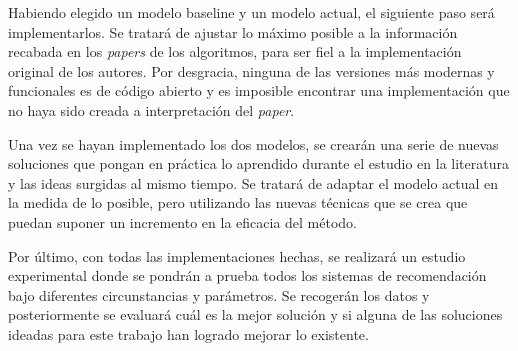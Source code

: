 Habiendo elegido un modelo baseline y un modelo actual, el siguiente paso será implementarlos. Se tratará de ajustar lo máximo posible a la información recabada en los \textit{papers} de los algoritmos, para ser fiel a la implementación original de los autores. Por desgracia, ninguna de las versiones más modernas y funcionales es de código abierto y es imposible encontrar una implementación que no haya sido creada a interpretación del \textit{paper}.

Una vez se hayan implementado los dos modelos, se crearán una serie de nuevas soluciones que pongan en práctica lo aprendido durante el estudio en la literatura y las ideas surgidas al mismo tiempo. Se tratará de adaptar el modelo actual en la medida de lo posible, pero utilizando las nuevas técnicas que se crea que puedan suponer un incremento en la eficacia del método.

Por último, con todas las implementaciones hechas, se realizará un estudio experimental donde se pondrán a prueba todos los sistemas de recomendación bajo diferentes circunstancias y parámetros. Se recogerán los datos y posteriormente se evaluará cuál es la mejor solución y si alguna de las soluciones ideadas para este trabajo han logrado mejorar lo existente.